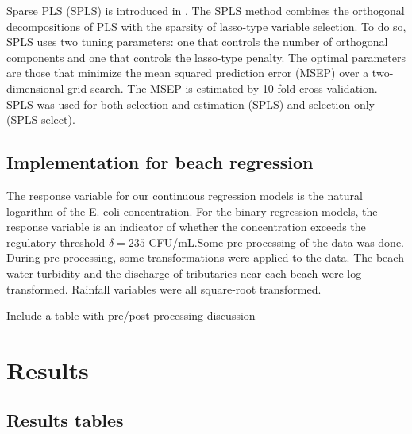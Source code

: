 \documentclass{article}\usepackage[]{graphicx}\usepackage[]{color}
\makeatletter
\newenvironment{kframe}{%
 \def\at@end@of@kframe{}%
 \ifinner\ifhmode%
  \def\at@end@of@kframe{\end{minipage}}%
  \begin{minipage}{\columnwidth}%
 \fi\fi%
 \def\FrameCommand##1{\hskip\@totalleftmargin \hskip-\fboxsep
 \colorbox{shadecolor}{##1}\hskip-\fboxsep
     \hskip-\linewidth \hskip-\@totalleftmargin \hskip\columnwidth}%
 \MakeFramed {\advance\hsize-\width
   \@totalleftmargin\z@ \linewidth\hsize
   \@setminipage}}%
 {\par\unskip\endMakeFramed%
 \at@end@of@kframe}
\newenvironment{knitrout}{}{} %
\numberwithin{equation}{section}
\numberwithin{figure}{section}
\renewcommand\[{\begin{equation}}
\renewcommand\]{\end{equation}}
\makeatother
\begin{document}
Sparse PLS (SPLS) is introduced in \citet{Chun-Keles-2007}. The SPLS
method combines the orthogonal decompositions of PLS with the sparsity
of lasso-type variable selection. To do so, SPLS uses two tuning parameters:
one that controls the number of orthogonal components and one that
controls the lasso-type penalty. The optimal parameters are those
that minimize the mean squared prediction error (MSEP) over a two-dimensional
grid search. The MSEP is estimated by 10-fold cross-validation. SPLS
was used for both selection-and-estimation (SPLS) and selection-only
(SPLS-select).


\subsection{Implementation for beach regression}

The response variable for our continuous regression models is the
natural logarithm of the E. coli concentration. For the binary regression
models, the response variable is an indicator of whether the concentration
exceeds the regulatory threshold $\delta=235$ CFU/mL.Some pre-processing
of the data was done. During pre-processing, some transformations
were applied to the data. The beach water turbidity and the discharge
of tributaries near each beach were log-transformed. Rainfall variables
were all square-root transformed.

Include a table with pre/post processing discussion

\begin{knitrout}
\color{fgcolor}\begin{kframe}


{\ttfamily\noindent\bfseries\color{errorcolor}{\#\# Error: unable to find an inherited method for function '[' for signature '"{}dgCMatrix"{}'}}

{\ttfamily\noindent\bfseries\color{errorcolor}{\#\# Error: object 'press.meanranks' not found}}\end{kframe}
\end{knitrout}


\section{Results}


\subsection{Results tables}
\end{document}
